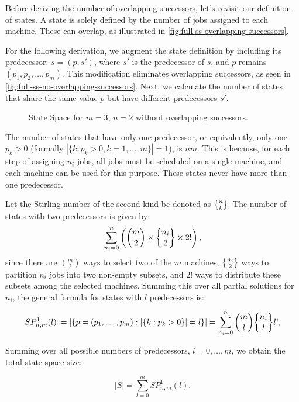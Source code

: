 Before deriving the number of overlapping successors, let's revisit our definition of states. A state is solely defined by the number of jobs assigned to each machine. These can overlap, as illustrated in \autoref{fig:full-ss-overlapping-successors}.

For the following derivation, we augment the state definition by including its predecessor: $s = (p, s')$, where $s'$ is the predecessor of $s$, and $p$ remains $(p_1, p_2, \dots, p_m)$. This modification eliminates overlapping successors, as seen in \autoref{fig:full-ss-no-overlapping-successors}. Next, we calculate the number of states that share the same value $p$ but have different predecessors $s'$.

\begin{figure}[h!]
    \centering
    
    \caption{State Space for $m=3$, $n=2$ without overlapping successors.}
    \label{fig:full-ss-no-overlapping-successors}
\end{figure}

The number of states that have only one predecessor, or equivalently, only one $p_k > 0$ (formally $|\{k : p_k > 0, k = 1, \dots, m\}| = 1$), is $nm$. This is because, for each step of assigning $n_i$ jobs, all jobs must be scheduled on a single machine, and each machine can be used for this purpose. These states never have more than one predecessor.

Let the Stirling number of the second kind be denoted as $\stirlingS{n}{k}$. The number of states with two predecessors is given by:
\[
    \sum_{n_i=0}^n \left( \binom{m}{2} \times \stirlingS{n_i}{2} \times 2! \right),
\]
since there are $\binom{m}{2}$ ways to select two of the $m$ machines, $\stirlingS{n_i}{2}$ ways to partition $n_i$ jobs into two non-empty subsets, and $2!$ ways to distribute these subsets among the selected machines. Summing this over all partial solutions for $n_i$, the general formula for states with $l$ predecessors is:

\begin{equation}
    SP^1_{n,m}(l) \coloneqq \left| \{ p = (p_1, \dots, p_m) : |\{ k : p_k > 0 \}| = l \} \right| = \sum_{n_i=0}^{n} \binom{m}{l} \stirlingS{n_i}{l} l!,
    \label{eq:sp1}
\end{equation}

Summing over all possible numbers of predecessors, $l = 0, \dots, m$, we obtain the total state space size:

\[
    |S| = \sum_{l=0}^m SP^1_{n,m}(l).
\]


